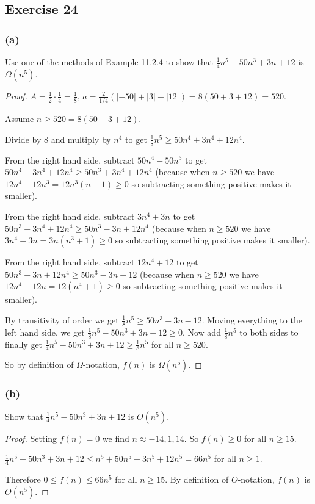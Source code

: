 \documentclass[14pt]{extarticle}
\newcommand{\dps}{\displaystyle}
\begin{document}
\subsection{Exercise 24}
\subsubsection{(a)}
Use one of the methods of Example 11.2.4 to show that \(\frac{1}{4}n^5 - 50n^3 + 3n + 12\) is \(\Omega(n^5)\).

\begin{proof}
    \(A = \frac{1}{2} \cdot \frac{1}{4} = \frac{1}{8}\), \(\dps a = \frac{2}{1/4}(|-50| + |3| + |12|) = 8(50 + 3 + 12)= 520\).

    Assume \(n \geq 520 = 8(50+3+12)\).

    Divide by 8 and multiply by \(n^4\) to get \(\dps \frac{1}{8}n^5 \geq 50n^4 + 3n^4 + 12n^4\).

    From the right hand side, subtract \(50n^4 - 50n^3\) to get \(50n^4 + 3n^4 + 12n^4 \geq 50n^3 + 3n^4 + 12n^4\) (because
    when \(n \geq 520\) we have \(12n^4 - 12n^3 = 12n^3(n-1) \geq 0\) so subtracting something positive makes it smaller).

    From the right hand side, subtract \(3n^4 + 3n\) to get \(50n^3 + 3n^4 + 12n^4 \geq 50n^3 - 3n + 12n^4\) (because
    when \(n \geq 520\) we have \(3n^4 + 3n = 3n(n^3+1) \geq 0\) so subtracting something positive makes it smaller).

    From the right hand side, subtract \(12n^4 + 12\) to get \(50n^3 - 3n + 12n^4 \geq 50n^3 - 3n - 12\) (because when
    \(n \geq 520\) we have \(12n^4 + 12n = 12(n^4+1) \geq 0\) so subtracting something positive makes it smaller).

    By transitivity of order we get \(\dps \frac{1}{8}n^5 \geq 50n^3 - 3n - 12\). Moving everything to the left hand side, we
    get \(\dps \frac{1}{8}n^5 - 50n^3 + 3n + 12 \geq 0\). Now add \(\dps \frac{1}{8}n^5\) to both sides to finally get
    \(\dps \frac{1}{4}n^5 - 50n^3 + 3n + 12 \geq \frac{1}{8}n^5\) for all \(n \geq 520\).

    So by definition of \(\Omega\)-notation, \(f(n)\) is \(\Omega(n^5)\).
\end{proof}

\subsubsection{(b)}
Show that \(\frac{1}{4}n^5 - 50n^3 + 3n + 12\) is \(O(n^5)\).
\begin{proof}
    Setting \(f(n) = 0\) we find \(n \approx -14, 1, 14\). So \(f(n) \geq 0\) for all \(n \geq 15\).

    \(\frac{1}{4}n^5 - 50n^3 + 3n + 12 \leq n^5 + 50n^5 + 3n^5 + 12n^5 = 66n^5\) for all \(n \geq 1\).

    Therefore \(0 \leq f(n) \leq 66n^5\) for all \(n \geq 15\). By definition of \(O\)-notation, \(f(n)\) is \(O(n^5)\).
\end{proof}
\end{document}
